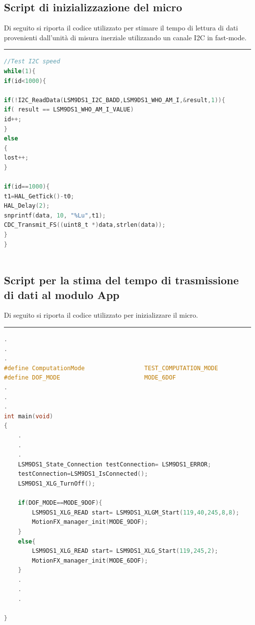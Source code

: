 \subsection{Script di inizializzazione del micro}
Di seguito si riporta il codice utilizzato per stimare il tempo di lettura di dati provenienti dall'unità di misura inerziale utilizzando un canale I2C in fast-mode.\\
\noindent\rule{14.1cm}{0.4pt}
\begin{lstlisting}[language=C]
//Test I2C speed
while(1){
if(id<1000){

if(!I2C_ReadData(LSM9DS1_I2C_BADD,LSM9DS1_WHO_AM_I,&result,1)){
if( result == LSM9DS1_WHO_AM_I_VALUE)
id++;
}
else
{
lost++;
}

if(id==1000){
t1=HAL_GetTick()-t0;
HAL_Delay(2);
snprintf(data, 10, "%Lu",t1);
CDC_Transmit_FS((uint8_t *)data,strlen(data));
}
}



\end{lstlisting}


\subsection{Script per la stima del tempo di trasmissione di dati al modulo App}
\label{app:init}
Di seguito si riporta il codice utilizzato per inizializzare il micro.\\
\noindent\rule{14.1cm}{0.4pt}

\begin{lstlisting}[language=C]
.
.
.
#define ComputationMode					TEST_COMPUTATION_MODE
#define DOF_MODE						MODE_6DOF
.
.
. 
int main(void)
{
	.
	.
	.
	LSM9DS1_State_Connection testConnection= LSM9DS1_ERROR;
	testConnection=LSM9DS1_IsConnected();
	LSM9DS1_XLG_TurnOff();
	
	if(DOF_MODE==MODE_9DOF){
		LSM9DS1_XLG_READ start= LSM9DS1_XLGM_Start(119,40,245,8,8);
		MotionFX_manager_init(MODE_9DOF);
	}
	else{
		LSM9DS1_XLG_READ start= LSM9DS1_XLG_Start(119,245,2);
		MotionFX_manager_init(MODE_6DOF);
	}
	.
	.
	.

}


\end{lstlisting}

